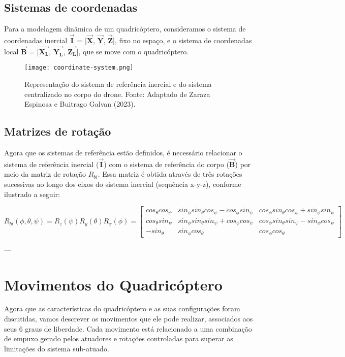 \subsection{Sistemas de coordenadas}
Para a modelagem dinâmica de um quadricóptero, consideramos o sistema de coordenadas inercial $\boldsymbol{\vec{I}}$ = [$\boldsymbol{\vec{X}}$, $\boldsymbol{\vec{Y}}$, $\boldsymbol{\vec{Z}}$], fixo no espaço, e o sistema de coordenadas local $\boldsymbol{\vec{B}}$ = [$\boldsymbol{\vec{X_L}}$, $\boldsymbol{\vec{Y_L}}$, $\boldsymbol{\vec{Z_L}}$], que se move com o quadricóptero.

\begin{figure}[H]
	\centering
	\texttt{[image: coordinate-system.png]}
	\caption{Representação do sistema de referência inercial e do sistema centralizado no corpo do drone. Fonte: Adaptado de Zaraza Espinosa e Buitrago Galvan (2023).}
	\centering
	\label{fig:coordinate-system}
\end{figure}

\subsection{Matrizes de rotação}
Agora que os sistemas de referência estão definidos, é necessário relacionar o sistema de referência inercial ($\boldsymbol{\vec{I}}$) com o sistema de referência do corpo ($\boldsymbol{\vec{B}}$) por meio da matriz de rotação $R_{bi}$. Essa matriz é obtida através de três rotações sucessivas ao longo dos eixos do sistema inercial (sequência x-y-z), conforme ilustrado a seguir:

\begin{equation}
	R_{bi}(\phi,\theta,\psi) = R_z(\psi) R_y(\theta) R_x(\phi) =
	\begin{bmatrix}
		cos_\theta cos_\psi & sin_\phi sin_\theta cos_\psi - cos_\phi sin_\psi & cos_\phi sin_\theta cos_\psi + sin_\phi sin_\psi \\
		cos_\theta sin_\psi & sin_\phi sin_\theta sin_\psi + cos_\phi cos_\psi & cos_\phi sin_\theta sin_\psi - sin_\phi cos_\psi \\
		-sin_\theta         & sin_\phi cos_\theta                              & cos_\phi cos_\theta
	\end{bmatrix}
\end{equation}

---

\section{Movimentos do Quadricóptero}
Agora que as características do quadricóptero e as suas configurações foram discutidas, vamos descrever os movimentos que ele pode realizar, associados aos seus 6 graus de liberdade. Cada movimento está relacionado a uma combinação de empuxo gerado pelos atuadores e rotações controladas para superar as limitações do sistema sub-atuado.

